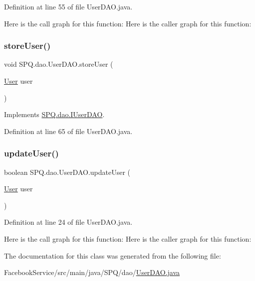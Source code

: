 Definition at line 55 of file User\+D\+A\+O.\+java.

Here is the call graph for this function\+:
Here is the caller graph for this function\+:
\mbox{\label{class_s_p_q_1_1dao_1_1_user_d_a_o_a9cc4105782c52054e71fa4938b55f7aa}} 
\subsubsection{\texorpdfstring{store\+User()}{storeUser()}\hspace{0.1cm}{\footnotesize\ttfamily [2/2]}}
{\footnotesize\ttfamily void S\+P\+Q.\+dao.\+User\+D\+A\+O.\+store\+User (\begin{DoxyParamCaption}\item[{\mbox{\hyperlink{class_s_p_q_1_1data_1_1_user}{User}}}]{user }\end{DoxyParamCaption})}



Implements \mbox{\hyperlink{interface_s_p_q_1_1dao_1_1_i_user_d_a_o_a286f084c9e920d1ce196658ab63ab0af}{S\+P\+Q.\+dao.\+I\+User\+D\+AO}}.



Definition at line 65 of file User\+D\+A\+O.\+java.

\mbox{\label{class_s_p_q_1_1dao_1_1_user_d_a_o_a525b7db52aab94cfe24aeac14949504e}} 
\subsubsection{\texorpdfstring{update\+User()}{updateUser()}}
{\footnotesize\ttfamily boolean S\+P\+Q.\+dao.\+User\+D\+A\+O.\+update\+User (\begin{DoxyParamCaption}\item[{\mbox{\hyperlink{class_s_p_q_1_1data_1_1_user}{User}}}]{user }\end{DoxyParamCaption})}



Definition at line 24 of file User\+D\+A\+O.\+java.

Here is the call graph for this function\+:
Here is the caller graph for this function\+:


The documentation for this class was generated from the following file\+:\begin{DoxyCompactItemize}
\item 
Facebook\+Service/src/main/java/\+S\+P\+Q/dao/\mbox{\hyperlink{_facebook_service_2src_2main_2java_2_s_p_q_2dao_2_user_d_a_o_8java}{User\+D\+A\+O.\+java}}\end{DoxyCompactItemize}

